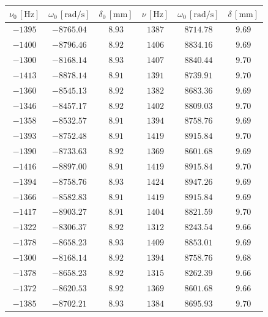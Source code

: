\documentclass[]{article}
\begin{document}
    \begin{table}
        \centering
        \begin{tabular}{||c|c|c||c|c|c||}
            \hline
            $\nu_0\, [\text{Hz}] $ & $\omega_0\, [\text{rad/s}] $ & $\delta_0\, [\text{mm}] $ & $\nu\, [\text{Hz}] $ & $\omega_0\, [\text{rad/s}] $ & $\delta\, [\text{mm}] $ \\
            \hline\hline
            $-1395$ & $-8765.04 $ & $8.93$ & $1387$ & $8714.78$ & $9.69$\\\hline
            $-1400$ & $-8796.46 $ & $8.92$ & $1406$ & $8834.16$ & $9.69$\\\hline
            $-1300$ & $-8168.14 $ & $8.93$ & $1407$ & $8840.44$ & $9.70$\\\hline
            $-1413$ & $-8878.14 $ & $8.91$ & $1391$ & $8739.91$ & $9.70$\\\hline
            $-1360$ & $-8545.13 $ & $8.92$ & $1382$ & $8683.36$ & $9.69$\\\hline
            $-1346$ & $-8457.17 $ & $8.92$ & $1402$ & $8809.03$ & $9.70$\\\hline
            $-1358$ & $-8532.57 $ & $8.91$ & $1394$ & $8758.76$ & $9.69$\\\hline
            $-1393$ & $-8752.48 $ & $8.91$ & $1419$ & $8915.84$ & $9.70$\\\hline
            $-1390$ & $-8733.63 $ & $8.92$ & $1369$ & $8601.68$ & $9.69$\\\hline
            $-1416$ & $-8897.00 $ & $8.91$ & $1419$ & $8915.84$ & $9.70$\\\hline
            $-1394$ & $-8758.76 $ & $8.93$ & $1424$ & $8947.26$ & $9.69$\\\hline
            $-1366$ & $-8582.83 $ & $8.91$ & $1419$ & $8915.84$ & $9.69$\\\hline
            $-1417$ & $-8903.27 $ & $8.91$ & $1404$ & $8821.59$ & $9.70$\\\hline
            $-1322$ & $-8306.37 $ & $8.92$ & $1312$ & $8243.54$ & $9.66$\\\hline
            $-1378$ & $-8658.23 $ & $8.93$ & $1409$ & $8853.01$ & $9.69$\\\hline
            $-1300$ & $-8168.14 $ & $8.92$ & $1394$ & $8758.76$ & $9.68$\\\hline
            $-1378$ & $-8658.23 $ & $8.92$ & $1315$ & $8262.39$ & $9.66$\\\hline
            $-1372$ & $-8620.53 $ & $8.92$ & $1369$ & $8601.68$ & $9.66$\\\hline
            $-1385$ & $-8702.21 $ & $8.93$ & $1384$ & $8695.93$ & $9.70$\\\hline

\end{tabular}
\end{table}
\end{document}
